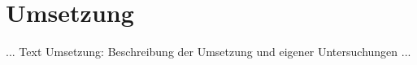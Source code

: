 \chapter{Umsetzung}
\label{cha:Umsetzung}

... Text Umsetzung: Beschreibung der Umsetzung und eigener Untersuchungen ...